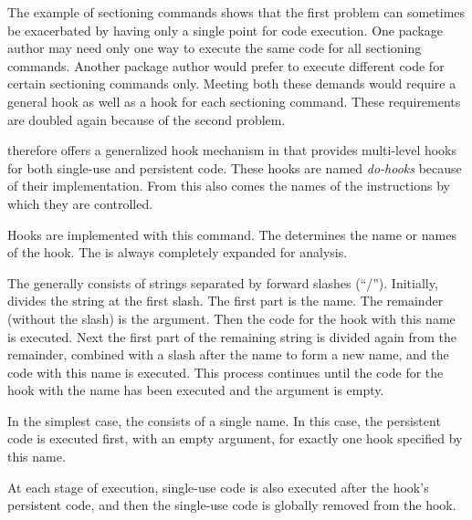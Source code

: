 The example of sectioning commands shows that the first problem can sometimes
be exacerbated by having only a single point for code execution. One package
author may need only one way to execute the same code for all sectioning
commands. Another package author would prefer to execute different code for
certain sectioning commands only. Meeting both these demands would require a
general hook as well as a hook for each sectioning command. These requirements
are doubled again because of the second problem.

\KOMAScript{} therefore offers a generalized hook mechanism in
 that provides multi-level hooks for both single-use and
persistent code. These hooks are named \emph{do-hooks} because of their
implementation. From this also comes the names of the instructions by which
they are controlled.

\begin{Declaration}
\end{Declaration}
Hooks are implemented with this
command. The  determines the name or names of the hook. The
 is always completely expanded for analysis.

The  generally consists of strings separated by forward
slashes (``/''). Initially,  divides the string at the
first slash. The first part is the name. The remainder (without the slash) is
the argument. Then the code for the hook with this name is executed. Next the
first part of the remaining string is divided again from the remainder,
combined with a slash after the name to form a new name, and the code with
this name is executed. This process continues until the code for the hook with
the name  has been executed and the argument is empty.

In the simplest case, the  consists of a single name. In this
case, the persistent code is executed first, with an empty argument, for
exactly one hook specified by this name.

At each stage of execution, single-use code is also executed after the hook's
persistent code, and then the single-use code is globally removed from the
hook.

